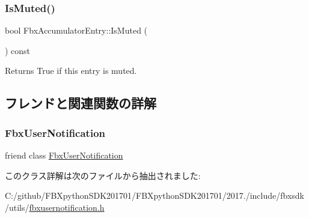 \subsubsection{\texorpdfstring{Is\+Muted()}{IsMuted()}}
{\footnotesize\ttfamily bool Fbx\+Accumulator\+Entry\+::\+Is\+Muted (\begin{DoxyParamCaption}{ }\end{DoxyParamCaption}) const}



Returns True if this entry is muted. 



\subsection{フレンドと関連関数の詳解}
\mbox{\label{class_fbx_accumulator_entry_a59b31f76d63ab836d795cdd0188a201a}} 
\subsubsection{\texorpdfstring{Fbx\+User\+Notification}{FbxUserNotification}}
{\footnotesize\ttfamily friend class \hyperlink{class_fbx_user_notification}{Fbx\+User\+Notification}\hspace{0.3cm}{\ttfamily [friend]}}



このクラス詳解は次のファイルから抽出されました\+:\begin{DoxyCompactItemize}
\item 
C\+:/github/\+F\+B\+Xpython\+S\+D\+K201701/\+F\+B\+Xpython\+S\+D\+K201701/2017./include/fbxsdk/utils/\hyperlink{fbxusernotification_8h}{fbxusernotification.\+h}\end{DoxyCompactItemize}
